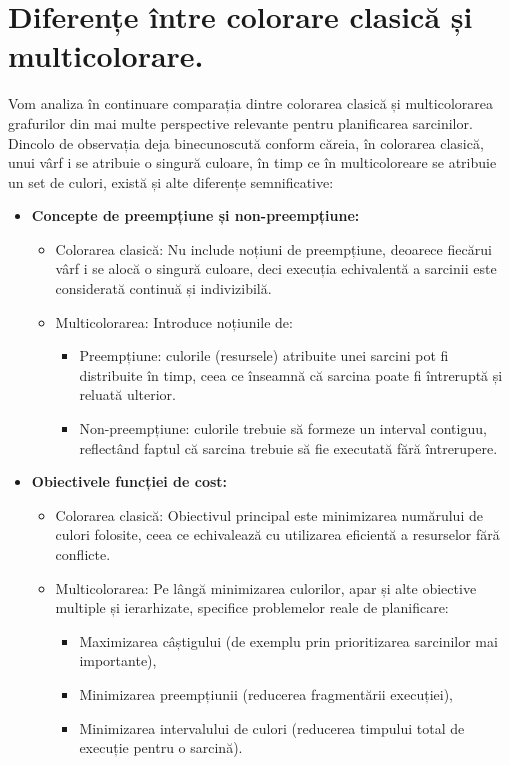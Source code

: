 \section{Diferențe între colorare clasică și multicolorare.}
 Vom analiza în continuare comparația dintre colorarea clasică și multicolorarea grafurilor din mai multe perspective relevante pentru planificarea sarcinilor. Dincolo de observația deja binecunoscută conform căreia, în colorarea clasică, unui vârf i se atribuie o singură culoare, în timp ce în multicoloreare se atribuie un set de culori, există și alte diferențe semnificative:
 \begin{itemize}
  \item {\bf Concepte de preempțiune și non-preempțiune:}
  \begin{itemize}
    \item Colorarea clasică:  Nu include noțiuni de preempțiune, deoarece fiecărui vârf i se alocă o singură culoare, deci execuția echivalentă a sarcinii este considerată continuă și indivizibilă.
    \item Multicolorarea: Introduce noțiunile de: 
    \begin{itemize}
      \item Preempțiune: culorile (resursele) atribuite unei sarcini pot fi distribuite în timp, ceea ce înseamnă că sarcina poate fi întreruptă și reluată ulterior.
      \item Non-preempțiune:  culorile trebuie să formeze un interval contiguu, reflectând faptul că sarcina trebuie să fie executată fără întrerupere.
    \end{itemize}
    \end{itemize}
    \item {\bf Obiectivele funcției de cost:}
    \begin{itemize}
      \item Colorarea clasică: Obiectivul principal este minimizarea numărului de culori folosite, ceea ce echivalează cu utilizarea eficientă a resurselor fără conflicte.
      \item Multicolorarea: Pe lângă minimizarea culorilor, apar și alte obiective multiple și ierarhizate, specifice problemelor reale de planificare:
      \begin{itemize}
        \item Maximizarea câștigului (de exemplu prin prioritizarea sarcinilor mai importante),
        \item Minimizarea preempțiunii (reducerea fragmentării execuției),
        \item Minimizarea intervalului de culori (reducerea timpului total de execuție pentru o sarcină).
      \end{itemize} 
    \end{itemize}   
  

\end{itemize}

